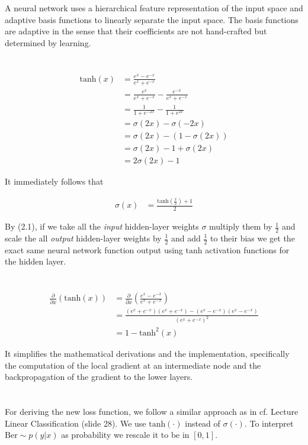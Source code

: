 \documentclass[11pt]{article}
\newcommand{\exercise}{\section{}}
\newcommand{\partialf}[1]{\frac{\partial}{{\partial #1}}}
\begin{document}
\exercise

A neural network uses a hierarchical feature representation of the input space and adaptive basis functions to linearly separate the input space. The basis functions are adaptive in the sense that their coefficients are not hand-crafted but determined by learning.

\exercise

\begin{align*}
\text{tanh}(x) &= \frac{e^x - e^{-x}}{e^x + e^{-x}} \\
&= \frac{e^x}{e^x + e^{-x}} - \frac{e^{-x}}{e^x + e^{-x}} \\
&= \frac{1}{1 + e^{-2x}} - \frac{1}{1 + e^{2x}} \\
&= \sigma(2x) - \sigma(-2x) \\
&= \sigma(2x) - (1 - \sigma(2x)) \\
&= \sigma(2x) - 1 + \sigma(2x) \\
&= 2\sigma(2x) - 1
\end{align*}

It immediately follows that

\begin{align*}
\sigma(x) &= \frac{\text{tanh}(\frac{x}{2}) + 1}{2} \tag{2.1}
\end{align*}

\noindent By (2.1), if we take all the \textit{input} hidden-layer weights $\sigma$ multiply them by $\frac{1}{2}$ and scale the all \textit{output} hidden-layer weights by $\frac{1}{2}$ and add $\frac{1}{2}$ to their bias we get the exact same neural network function output using $\text{tanh}$ activation functions for the hidden layer.

\exercise

\begin{align*}
\partialf{x}(\text{tanh}(x)) &= \partialf{x}(\frac{e^x - e^{-x}}{e^x + e^{-x}}) \\
&= \frac{ ( e^x + e^{-x} )( e^x + e^{-x}) - ( e^x - e^{-x} )( e^x - e^{-x} )}{ ( e^x + e^{-x} )^2 } \\
&= 1 - \text{tanh}^2(x)
\end{align*}

\noindent It simplifies the mathematical derivations and the implementation, specifically the computation of the local gradient at an intermediate node and the backpropagation of the gradient to the lower layers.

\exercise

For deriving the new loss function, we follow a similar approach as in cf. Lecture Linear Classification (slide 28). We use $ \text{tanh}( \cdot ) $ instead of $\sigma( \cdot )$. To interpret $\text{Ber} \sim p( y | x)$ as probability we rescale it to be in $[0, 1]$.
\end{document}
